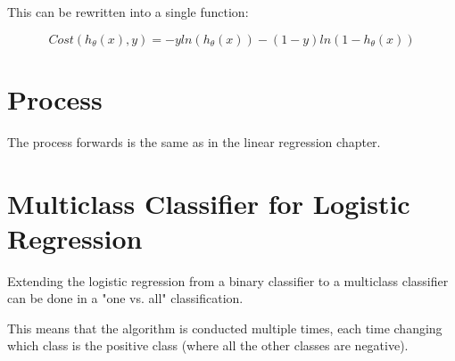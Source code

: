 This can be rewritten into a single function:

\begin{equation}
    Cost(h_\theta(x), y) = -y ln(h_\theta(x)) - (1-y)ln(1-h_\theta(x))
\end{equation}

\section{Process}
The process forwards is the same as in the linear regression chapter.

\section{Multiclass Classifier for Logistic Regression}
Extending the logistic regression from a binary classifier to a multiclass classifier can be done in a "one vs. all" classification.

This means that the algorithm is conducted multiple times, each time changing which class is the positive class (where all the other classes are negative).
